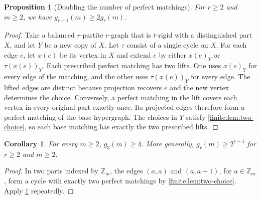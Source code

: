 \documentclass[10pt]{article}
\numberwithin{equation}{section}
\newtheorem{proposition}[proposition]{Proposition}\aliascntresetthe{proposition}
\newtheorem{corollary}[corollary]{Corollary}\aliascntresetthe{corollary}
\begin{document}
\begin{proposition}[Doubling the number of perfect matchings]\label{finite:prop:dimension-doubling}
For $r\ge2$ and $m\ge2$, we have $g_{r+1}(m)\ge2g_r(m)$.
\end{proposition}
\begin{proof}
Take a balanced $r$-partite $r$-graph that is $t$-rigid with a distinguished part $X$, and let $Y$ be a new copy of $X$. Let $\tau$ consist of a single cycle on $X$. For each edge $e$, let $x(e)$ be its vertex in $X$ and extend $e$ by either $x(e)_Y$ or $\tau(x(e))_Y$. Each prescribed perfect matching has two lifts. One uses $x(e)_Y$ for every edge of the matching, and the other uses $\tau(x(e))_Y$ for every edge. The lifted edges are distinct because projection recovers $e$ and the new vertex determines the choice. Conversely, a perfect matching in the lift covers each vertex in every original part exactly once. Its projected edges therefore form a perfect matching of the base hypergraph. The choices in $Y$ satisfy \cref{finite:lem:two-choice}, so each base matching has exactly the two prescribed lifts.
\end{proof}

\begin{corollary}\label{finite:four-baseline}
For every $m\ge2$, $g_3(m)\ge4$.
More generally, $g_r(m)\ge2^{r-1}$ for $r\ge2$ and $m\ge2$.
\end{corollary}
\begin{proof}
In two parts indexed by $\mathbb Z_m$, the edges $(a,a)$ and $(a,a+1)$, for $a\in\mathbb Z_m$, form a cycle with exactly two perfect matchings by \cref{finite:lem:two-choice}.
Apply \cref{finite:prop:dimension-doubling} repeatedly.
\end{proof}
\end{document}

